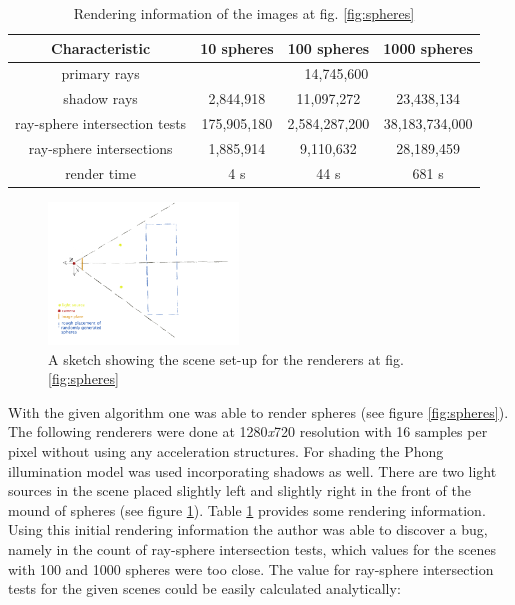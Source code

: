 \documentclass{article}
\begin{document}
\begin{table}[!ht]
\centering
	\begin{tabular}{*4c} 
		\hline
 		Characteristic & 10 spheres & 100 spheres & 1000 spheres \\ [0.5ex] 
 		\hline\hline
 		primary rays & \multicolumn{3}{c}{14,745,600} \\ 
 		shadow rays & 2,844,918 & 11,097,272 & 23,438,134 \\
 		ray-sphere intersection tests & 175,905,180 & 2,584,287,200 & 38,183,734,000 \\
 		ray-sphere intersections & 1,885,914 & 9,110,632 & 28,189,459 \\
 		render time & 4 s & 44 s & 681 s \\
 		\hline
	\end{tabular}
\caption{Rendering information of the images at fig. \ref{fig:spheres}}
\label{table:sphere_renders}
\end{table}

\begin{figure} 
    \centering
    \includegraphics[width=0.45\textwidth]{sphere_scene_sketch}
    \caption{A sketch showing the scene set-up for the renderers at fig. \ref{fig:spheres}}
    \label{fig:sphere_scene_sketch}
\end{figure}

With the given algorithm one was able to render spheres (see figure \ref{fig:spheres}). The following renderers were done at 1280\textit{x}720 resolution with 16 samples per pixel without using any acceleration structures. For shading the Phong illumination model was used incorporating shadows as well. There are two light sources in the scene placed slightly left and slightly right in the front of the mound of spheres (see figure \ref{fig:sphere_scene_sketch}). Table \ref{table:sphere_renders} provides some rendering information. Using this initial rendering information the author was able to discover a bug, namely in the count of ray-sphere intersection tests, which values for the scenes with 100 and 1000 spheres were too close. The value for ray-sphere intersection tests for the given scenes could be easily calculated analytically:
\end{document}
